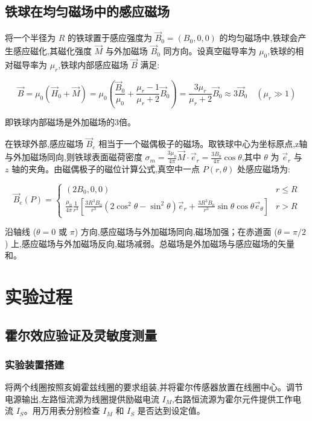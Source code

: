 \documentclass[UTF8]{ctexart}
\begin{document}
    \subsection{铁球在均匀磁场中的感应磁场}
    
    将一个半径为 $R$ 的铁球置于感应强度为 $\vec{B}_0=(B_0,0,0)$ 的均匀磁场中,铁球会产生感应磁化,其磁化强度 $\vec{M}$ 与外加磁场 $\vec{B}_0$ 同方向。设真空磁导率为 $\mu_0$,铁球的相对磁导率为 $\mu_r$,铁球内部感应磁场 $\vec{B}$ 满足:
    
    \begin{equation}
    \vec{B} = \mu_0(\vec{H}_0+\vec{M}) = \mu_0\left(\frac{\vec{B}_0}{\mu_0}+\frac{\mu_r-1}{\mu_r+2}\vec{B}_0\right) = \frac{3\mu_r}{\mu_r+2}\vec{B}_0 \approx 3\vec{B}_0 \quad (\mu_r \gg 1)
    \end{equation}
    
    即铁球内部磁场是外加磁场的3倍。
    
    在铁球外部,感应磁场 $\vec{B}_e$ 相当于一个磁偶极子的磁场。取铁球中心为坐标原点,z轴与外加磁场同向,则铁球表面磁荷密度 $\sigma_m=\frac{3\mu_0}{4\pi}\vec{M}\cdot\vec{e}_r=\frac{3B_0}{4\pi}\cos\theta$,其中 $\theta$ 为 $\vec{e}_r$ 与 $z$ 轴的夹角。由磁偶极子的磁位计算公式,真空中一点 $P(r,\theta)$ 处感应磁场为:
    
    \begin{equation}
        \vec{B}_e(P) = 
        \begin{cases}
            (2B_0,0,0) & r \leq R \\
            \frac{\mu_0}{4\pi}\frac{1}{r^3} \left[ \frac{3R^3B_0}{r^3}(2\cos^2\theta-\sin^2\theta)\vec{e}_r + \frac{3R^3B_0}{r^3}\sin\theta\cos\theta\vec{e}_{\theta} \right] & r > R
        \end{cases}  
    \end{equation}
    
    沿轴线 ($\theta=0$ 或 $\pi$) 方向,感应磁场与外加磁场同向,磁场加强；在赤道面 ($\theta=\pi/2$) 上,感应磁场与外加磁场反向,磁场减弱。总磁场是外加磁场与感应磁场的矢量和。


    \section{实验过程}

    \subsection{霍尔效应验证及灵敏度测量}
    
    \subsubsection{实验装置搭建}
    将两个线圈按照亥姆霍兹线圈的要求组装,并将霍尔传感器放置在线圈中心。调节电源输出,左路恒流源为线圈提供励磁电流 $I_M$,右路恒流源为霍尔元件提供工作电流 $I_S$。用万用表分别检查 $I_M$ 和 $I_S$ 是否达到设定值。
    
\end{document}

